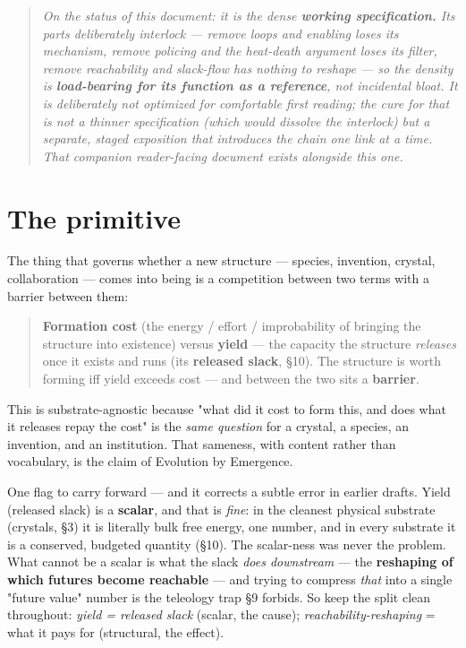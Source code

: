 \documentclass{article}
\begin{document}
\begin{quote}
\itshape
On the status of this document: it is the dense \textbf{working specification.} Its parts deliberately interlock --- remove loops and enabling loses its mechanism, remove policing and the heat-death argument loses its filter, remove reachability and slack-flow has nothing to reshape --- so the density is \textbf{load-bearing for its function as a reference}, not incidental bloat. It is deliberately \textit{not} optimized for comfortable first reading; the cure for that is not a thinner specification (which would dissolve the interlock) but a separate, staged exposition that introduces the chain one link at a time. That companion reader-facing document exists alongside this one.
\end{quote}

\hr

\section{The primitive}
The thing that governs whether a new structure --- species, invention, crystal, collaboration --- comes into being is a competition between two terms with a barrier between them:

\begin{quote}
\textbf{Formation cost} (the energy / effort / improbability of bringing the structure into existence) versus \textbf{yield} --- the capacity the structure \textit{releases} once it exists and runs (its \textbf{released slack}, §10). The structure is worth forming iff yield exceeds cost --- and between the two sits a \textbf{barrier}.
\end{quote}

This is substrate-agnostic because "what did it cost to form this, and does what it releases repay the cost" is the \textit{same question} for a crystal, a species, an invention, and an institution. That sameness, with content rather than vocabulary, is the claim of Evolution by Emergence.

One flag to carry forward --- and it corrects a subtle error in earlier drafts. Yield (released slack) is a \textbf{scalar}, and that is \textit{fine}: in the cleanest physical substrate (crystals, §3) it is literally bulk free energy, one number, and in every substrate it is a conserved, budgeted quantity (§10). The scalar-ness was never the problem. What cannot be a scalar is what the slack \textit{does downstream} --- the \textbf{reshaping of which futures become reachable} --- and trying to compress \textit{that} into a single "future value" number is the teleology trap §9 forbids. So keep the split clean throughout: \textit{yield = released slack} (scalar, the cause); \textit{reachability-reshaping} = what it pays for (structural, the effect).
\end{document}
